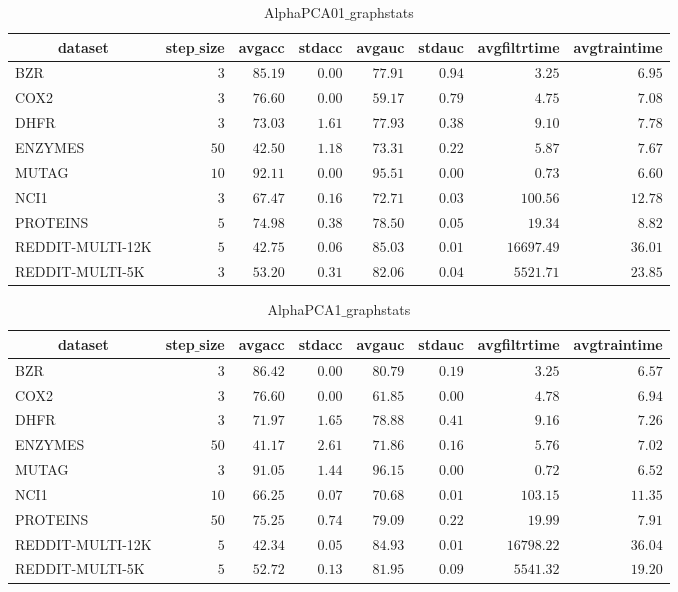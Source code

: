 \documentclass[]{article}
\begin{document}
\begin{table}[!tbp]
\caption{AlphaPCA01$\_$graphstats\label{AlphaPCA01_graphstats}} 
{\centering
\begin{tabular}{lrrrrrrr}
\hline\hline
\multicolumn{1}{c}{dataset}&\multicolumn{1}{c}{step$\_$size}&\multicolumn{1}{c}{avgacc}&\multicolumn{1}{c}{stdacc}&\multicolumn{1}{c}{avgauc}&\multicolumn{1}{c}{stdauc}&\multicolumn{1}{c}{avgfiltrtime}&\multicolumn{1}{c}{avgtraintime}\tabularnewline
\hline
BZR&$ 3$&$85.19$&$0.00$&$77.91$&$0.94$&$    3.25$&$ 6.95$\tabularnewline
COX2&$ 3$&$76.60$&$0.00$&$59.17$&$0.79$&$    4.75$&$ 7.08$\tabularnewline
DHFR&$ 3$&$73.03$&$1.61$&$77.93$&$0.38$&$    9.10$&$ 7.78$\tabularnewline
ENZYMES&$50$&$42.50$&$1.18$&$73.31$&$0.22$&$    5.87$&$ 7.67$\tabularnewline
MUTAG&$10$&$92.11$&$0.00$&$95.51$&$0.00$&$    0.73$&$ 6.60$\tabularnewline
NCI1&$ 3$&$67.47$&$0.16$&$72.71$&$0.03$&$  100.56$&$12.78$\tabularnewline
PROTEINS&$ 5$&$74.98$&$0.38$&$78.50$&$0.05$&$   19.34$&$ 8.82$\tabularnewline
REDDIT-MULTI-12K&$ 5$&$42.75$&$0.06$&$85.03$&$0.01$&$16697.49$&$36.01$\tabularnewline
REDDIT-MULTI-5K&$ 3$&$53.20$&$0.31$&$82.06$&$0.04$&$ 5521.71$&$23.85$\tabularnewline
\hline
\end{tabular}}
\end{table}
\begin{table}[!tbp]
\caption{AlphaPCA1$\_$graphstats\label{AlphaPCA1_graphstats}} 
{\centering
\begin{tabular}{lrrrrrrr}
\hline\hline
\multicolumn{1}{c}{dataset}&\multicolumn{1}{c}{step$\_$size}&\multicolumn{1}{c}{avgacc}&\multicolumn{1}{c}{stdacc}&\multicolumn{1}{c}{avgauc}&\multicolumn{1}{c}{stdauc}&\multicolumn{1}{c}{avgfiltrtime}&\multicolumn{1}{c}{avgtraintime}\tabularnewline
\hline
BZR&$ 3$&$86.42$&$0.00$&$80.79$&$0.19$&$    3.25$&$ 6.57$\tabularnewline
COX2&$ 3$&$76.60$&$0.00$&$61.85$&$0.00$&$    4.78$&$ 6.94$\tabularnewline
DHFR&$ 3$&$71.97$&$1.65$&$78.88$&$0.41$&$    9.16$&$ 7.26$\tabularnewline
ENZYMES&$50$&$41.17$&$2.61$&$71.86$&$0.16$&$    5.76$&$ 7.02$\tabularnewline
MUTAG&$ 3$&$91.05$&$1.44$&$96.15$&$0.00$&$    0.72$&$ 6.52$\tabularnewline
NCI1&$10$&$66.25$&$0.07$&$70.68$&$0.01$&$  103.15$&$11.35$\tabularnewline
PROTEINS&$50$&$75.25$&$0.74$&$79.09$&$0.22$&$   19.99$&$ 7.91$\tabularnewline
REDDIT-MULTI-12K&$ 5$&$42.34$&$0.05$&$84.93$&$0.01$&$16798.22$&$36.04$\tabularnewline
REDDIT-MULTI-5K&$ 5$&$52.72$&$0.13$&$81.95$&$0.09$&$ 5541.32$&$19.20$\tabularnewline
\hline
\end{tabular}}
\end{table}
\end{document}
